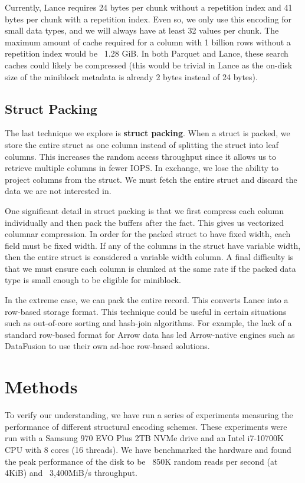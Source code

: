 \documentclass[sigconf, nonacm]{acmart}
\begin{document}
Currently, Lance requires 24 bytes per chunk without a repetition index and 41 bytes per chunk with a repetition index.  Even so, we only use this encoding for small data types, and we will always have at least 32 values per chunk.  The maximum amount of cache required for a column with 1 billion rows without a repetition index would be ~1.28 GiB.  In both Parquet and Lance, these search caches could likely be compressed (this would be trivial in Lance as the on-disk size of the miniblock metadata is already 2 bytes instead of 24 bytes).

\subsection{Struct Packing} \label{struct-packing}

The last technique we explore is \textbf{struct packing}.  When a struct is packed, we store the entire struct as one column instead of splitting the struct into leaf columns.  This increases the random access throughput since it allows us to retrieve multiple columns in fewer IOPS.  In exchange, we lose the ability to project columns from the struct.  We must fetch the entire struct and discard the data we are not interested in.

One significant detail in struct packing is that we first compress each column individually and then pack the buffers after the fact.  This gives us vectorized columnar compression.  In order for the packed struct to have fixed width, each field must be fixed width.  If any of the columns in the struct have variable width, then the entire struct is considered a variable width column.  A final difficulty is that we must ensure each column is chunked at the same rate if the packed data type is small enough to be eligible for miniblock.

In the extreme case, we can pack the entire record.  This converts Lance into a row-based storage format.  This technique could be useful in certain situations such as out-of-core sorting and hash-join algorithms.  For example, the lack of a standard row-based format for Arrow data has led Arrow-native engines such as DataFusion to use their own ad-hoc row-based solutions.

\section{Methods}

To verify our understanding, we have run a series of experiments measuring the performance of different structural encoding schemes.  These experiments were run with a Samsung 970 EVO Plus 2TB NVMe drive and an Intel i7-10700K CPU with 8 cores (16 threads).  We have benchmarked the hardware and found the peak performance of the disk to be ~850K random reads per second (at 4KiB) and ~3,400MiB/s throughput.
\end{document}
